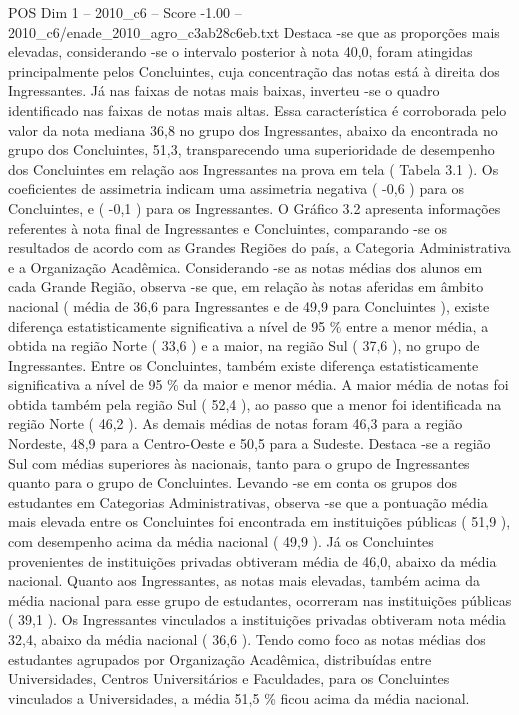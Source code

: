 \begin{textsample}{POS Dim 1 – 2010\_c6 – Score -1.00 – 2010\_c6/enade\_2010\_agro\_c3ab28c6eb.txt}
Destaca -se que as proporções mais elevadas, considerando -se o intervalo posterior à nota 40,0, foram atingidas principalmente pelos Concluintes, cuja concentração das notas está à direita dos Ingressantes.
Já nas faixas de notas mais baixas, inverteu -se o quadro identificado nas faixas de notas mais altas.
Essa característica é corroborada pelo valor da nota mediana 36,8 no grupo dos Ingressantes, abaixo da encontrada no grupo dos Concluintes, 51,3, transparecendo uma superioridade de desempenho dos Concluintes em relação aos Ingressantes na prova em tela ( Tabela 3.1 ).
Os coeficientes de assimetria indicam uma assimetria negativa ( -0,6 ) para os Concluintes, e ( -0,1 ) para os Ingressantes.
O Gráfico 3.2 apresenta informações referentes à nota final de Ingressantes e Concluintes, comparando -se os resultados de acordo com as Grandes Regiões do país, a Categoria Administrativa e a Organização Acadêmica.
Considerando -se as notas médias dos alunos em cada Grande Região, observa -se que, em relação às notas aferidas em âmbito nacional ( média de 36,6 para Ingressantes e de 49,9 para Concluintes ), existe diferença estatisticamente significativa a nível de 95 \% entre a menor média, a obtida na região Norte ( 33,6 ) e a maior, na região Sul ( 37,6 ), no grupo de Ingressantes.
Entre os Concluintes, também existe diferença estatisticamente significativa a nível de 95 \% da maior e menor média.
A maior média de notas foi obtida também pela região Sul ( 52,4 ), ao passo que a menor foi identificada na região Norte ( 46,2 ).
As demais médias de notas foram 46,3 para a região Nordeste, 48,9 para a Centro-Oeste e 50,5 para a Sudeste.
Destaca -se a região Sul com médias superiores às nacionais, tanto para o grupo de Ingressantes quanto para o grupo de Concluintes.
Levando -se em conta os grupos dos estudantes em Categorias Administrativas, observa -se que a pontuação média mais elevada entre os Concluintes foi encontrada em instituições públicas ( 51,9 ), com desempenho acima da média nacional ( 49,9 ).
Já os Concluintes provenientes de instituições privadas obtiveram média de 46,0, abaixo da média nacional.
Quanto aos Ingressantes, as notas mais elevadas, também acima da média nacional para esse grupo de estudantes, ocorreram nas instituições públicas ( 39,1 ).
Os Ingressantes vinculados a instituições privadas obtiveram nota média 32,4, abaixo da média nacional ( 36,6 ).
Tendo como foco as notas médias dos estudantes agrupados por Organização Acadêmica, distribuídas entre Universidades, Centros Universitários e Faculdades, para os Concluintes vinculados a Universidades, a média 51,5 \% ficou acima da média nacional.

\end{textsample}
